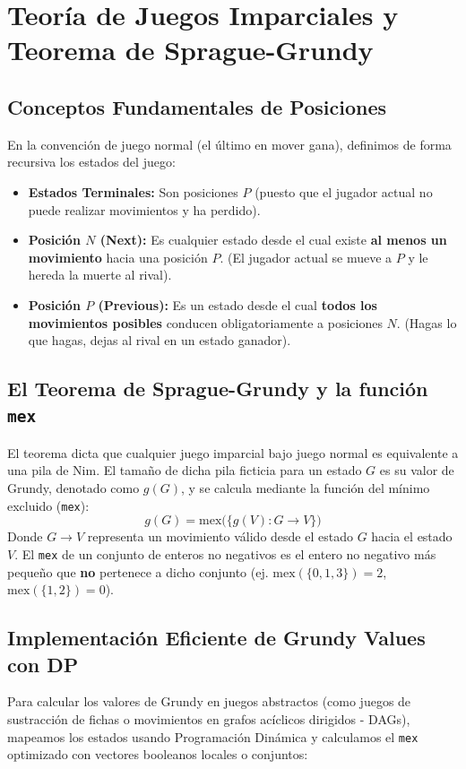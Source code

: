 \section{Teoría de Juegos Imparciales y Teorema de Sprague-Grundy}

\subsection{Conceptos Fundamentales de Posiciones}
En la convención de juego normal (el último en mover gana), definimos de forma recursiva los estados del juego:
\begin{itemize}
    \item \textbf{Estados Terminales:} Son posiciones $P$ (puesto que el jugador actual no puede realizar movimientos y ha perdido).
    \item \textbf{Posición $N$ (Next):} Es cualquier estado desde el cual existe \textbf{al menos un movimiento} hacia una posición $P$. (El jugador actual se mueve a $P$ y le hereda la muerte al rival).
    \item \textbf{Posición $P$ (Previous):} Es un estado desde el cual \textbf{todos los movimientos posibles} conducen obligatoriamente a posiciones $N$. (Hagas lo que hagas, dejas al rival en un estado ganador).
\end{itemize}

\subsection{El Teorema de Sprague-Grundy y la función \texttt{mex}}
El teorema dicta que cualquier juego imparcial bajo juego normal es equivalente a una pila de Nim. El tamaño de dicha pila ficticia para un estado $G$ es su valor de Grundy, denotado como $g(G)$, y se calcula mediante la función del mínimo excluido (\texttt{mex}):
$$g(G) = \text{mex}\big(\{ g(V) : G \to V \}\big)$$
Donde $G \to V$ representa un movimiento válido desde el estado $G$ hacia el estado $V$. El \texttt{mex} de un conjunto de enteros no negativos es el entero no negativo más pequeño que \textbf{no} pertenece a dicho conjunto (ej. $\text{mex}(\{0, 1, 3\}) = 2$, $\text{mex}(\{1, 2\}) = 0$).

\subsection{Implementación Eficiente de Grundy Values con DP}
Para calcular los valores de Grundy en juegos abstractos (como juegos de sustracción de fichas o movimientos en grafos acíclicos dirigidos - DAGs), mapeamos los estados usando Programación Dinámica y calculamos el \texttt{mex} optimizado con vectores booleanos locales o conjuntos:

